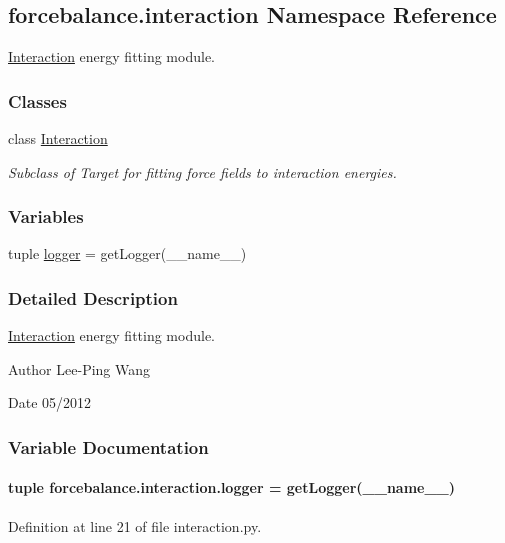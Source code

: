 \hypertarget{namespaceforcebalance_1_1interaction}{\subsection{forcebalance.\-interaction Namespace Reference}
\label{namespaceforcebalance_1_1interaction}
}


\hyperlink{classforcebalance_1_1interaction_1_1Interaction}{Interaction} energy fitting module.  


\subsubsection*{Classes}
\begin{DoxyCompactItemize}
\item 
class \hyperlink{classforcebalance_1_1interaction_1_1Interaction}{Interaction}
\begin{DoxyCompactList}\small\item\em Subclass of Target for fitting force fields to interaction energies. \end{DoxyCompactList}\end{DoxyCompactItemize}
\subsubsection*{Variables}
\begin{DoxyCompactItemize}
\item 
tuple \hyperlink{namespaceforcebalance_1_1interaction_a309586f260eec0d29772bfb7e0937a12}{logger} = get\-Logger(\-\_\-\-\_\-name\-\_\-\-\_\-)
\end{DoxyCompactItemize}


\subsubsection{Detailed Description}
\hyperlink{classforcebalance_1_1interaction_1_1Interaction}{Interaction} energy fitting module. \begin{DoxyAuthor}{Author}
Lee-\/\-Ping Wang 
\end{DoxyAuthor}
\begin{DoxyDate}{Date}
05/2012 
\end{DoxyDate}


\subsubsection{Variable Documentation}
\hypertarget{namespaceforcebalance_1_1interaction_a309586f260eec0d29772bfb7e0937a12}{
\paragraph[{logger}]{\setlength{\rightskip}{0pt plus 5cm}tuple forcebalance.\-interaction.\-logger = get\-Logger(\-\_\-\-\_\-name\-\_\-\-\_\-)}}\label{namespaceforcebalance_1_1interaction_a309586f260eec0d29772bfb7e0937a12}


Definition at line 21 of file interaction.\-py.

